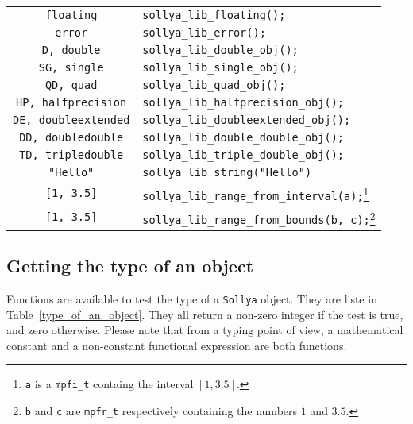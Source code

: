\documentclass[a4paper]{article}
\newcommand{\sollya}{\texttt{Sollya}\xspace}
\begin{document}
\begin{table}[htp]
\begin{minipage}{\textwidth}
\begin{center}
\begin{tabular}{|c|l|}
\verb|floating| & \verb|sollya_lib_floating();| \\
\verb|error| & \verb|sollya_lib_error();| \\
\verb|D, double| & \verb|sollya_lib_double_obj();| \\
\verb|SG, single| & \verb|sollya_lib_single_obj();| \\
\verb|QD, quad| & \verb|sollya_lib_quad_obj();| \\
\verb|HP, halfprecision| & \verb|sollya_lib_halfprecision_obj();| \\
\verb|DE, doubleextended| & \verb|sollya_lib_doubleextended_obj();| \\
\verb|DD, doubledouble| & \verb|sollya_lib_double_double_obj();| \\
\verb|TD, tripledouble| & \verb|sollya_lib_triple_double_obj();| \\
\verb|"Hello"| &  \verb|sollya_lib_string("Hello")| \\
\verb|[1, 3.5]| &  \verb|sollya_lib_range_from_interval(a);|\footnote{\texttt{a} is a \texttt{mpfi\_t} containg the interval $[1, 3.5]$.} \\
\verb|[1, 3.5]| &  \verb|sollya_lib_range_from_bounds(b, c);|\footnote[2]{\texttt{b} and \texttt{c} are \texttt{mpfr\_t} respectively containing the numbers $1$ and $3.5$.} \\ \hline
  \end{tabular}
\end{center}
\end{minipage}
\end{table}

\subsection{Getting the type of an object}
Functions are available to test the type of a \sollya object. They are liste in Table~\ref{type_of_an_object}. They all return a non-zero integer if the test is true, and zero otherwise. Please note that from a typing point of view, a mathematical constant and a non-constant functional expression are both functions.
\end{document}
